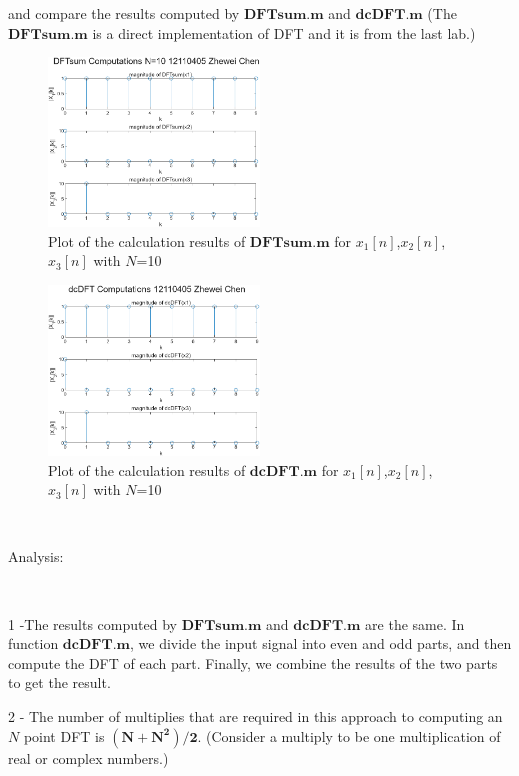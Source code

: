 \documentclass[journal]{IEEEtran}
\begin{document}
and compare the results computed by $\mathbf{DFTsum.m}$ and $\mathbf{dcDFT.m}$
(The $\mathbf{DFTsum.m}$ is a direct implementation of DFT and it is from the last lab.)
$~$
\begin{figure}[htbp]
   \centering
   \includegraphics[width=0.5\textwidth]{5311.png} %
\caption{Plot of the calculation results of $\mathbf{DFTsum.m}$ for $x_1[n]$,$x_2[n]$,$x_3[n]$ with $N$=10}
   \label{fig:5}
 \end{figure}

\begin{figure}[htbp]
   \centering
   \includegraphics[width=0.5\textwidth]{5312.png} %
\caption{Plot of the calculation results of $\mathbf{dcDFT.m}$ for $x_1[n]$,$x_2[n]$,$x_3[n]$ with $N$=10}
   \label{fig:6}
\end{figure}

$~$

\textcolor[rgb]{0,0.6,1}{Analysis:}

$~$

\textcolor[rgb]{0,0.6,1}{1 -}The results computed by $\mathbf{DFTsum.m}$ and $\mathbf{dcDFT.m}$ are the same. In function $\mathbf{dcDFT.m}$,
 we divide the input signal into even and odd parts, and then compute the DFT of each part. Finally, we combine the results of the two parts to get the result.
 
\textcolor[rgb]{0,0.6,1}{2 -}
The number of multiplies that are required in this approach to computing an $N$
point DFT is $\mathbf{(N+N^2)/2}$. (Consider a multiply to be one multiplication of real or complex numbers.) 
\end{document}

